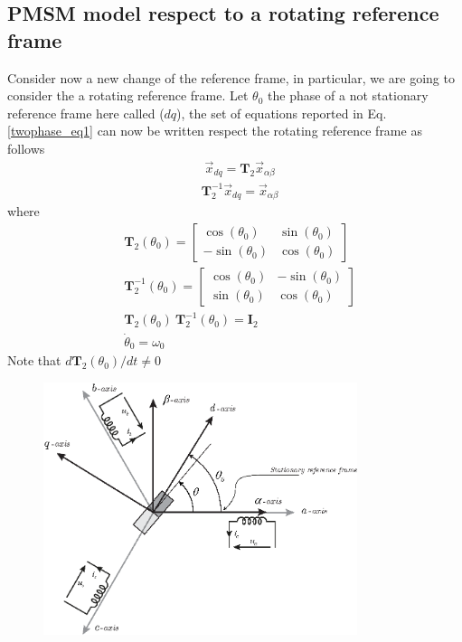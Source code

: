 \documentclass[11pt,a4paper]{article}
\numberwithin{equation}{section}
\theoremstyle{it}
\theoremstyle{definition}
\begin{document}
\begin{onehalfspace}
\subsection{PMSM model respect to a rotating reference frame}
Consider now a new change of the reference frame, in particular, we are going to consider the a rotating reference frame. Let $\theta_0$ the phase of a not stationary reference frame here called ($dq$), the set of equations reported in Eq. \ref{twophase_eq1} can now be written respect the rotating reference frame as follows
\begin{equation}
	\begin{aligned}\label{t2_0}
		& \vec{x}_{dq}=\mathbf{T}_2\vec{x}_{\alpha\beta}
	\end{aligned} 
\end{equation}
\begin{equation}\label{t2_1}
	\begin{aligned}
		& \mathbf{T}_2^{-1}\vec{x}_{dq}=\vec{x}_{\alpha\beta}
	\end{aligned} 
\end{equation}
where
\begin{equation}
	\begin{aligned}
		& \mathbf{T}_2(\theta_0) = 
		\begin{bmatrix}
			\cos(\theta_0) & \sin(\theta_0) \\[6pt]
			-\sin(\theta_0) & \cos(\theta_0) 
		\end{bmatrix} \\[6pt]
		& \mathbf{T}_2^{-1}(\theta_0) = 
		\begin{bmatrix}
			\cos(\theta_0) & -\sin(\theta_0) \\[6pt]
			\sin(\theta_0) & \cos(\theta_0) 
		\end{bmatrix}\\[6pt]
		& \mathbf{T}_2(\theta_0) \ \mathbf{T}_2^{-1}(\theta_0)= \mathbf{I}_2 \\[6pt]
		& \dot{\theta}_0=\omega_0
	\end{aligned} 
\end{equation}
Note that $d\mathbf{T}_2(\theta_0)/dt \ne 0$
\begin{figure}[H]
	\centering
	\includegraphics[width = 260pt, keepaspectratio]{figures/pmsm/reference_frames_dq.eps}

\end{figure}
\end{onehalfspace}
\end{document}
